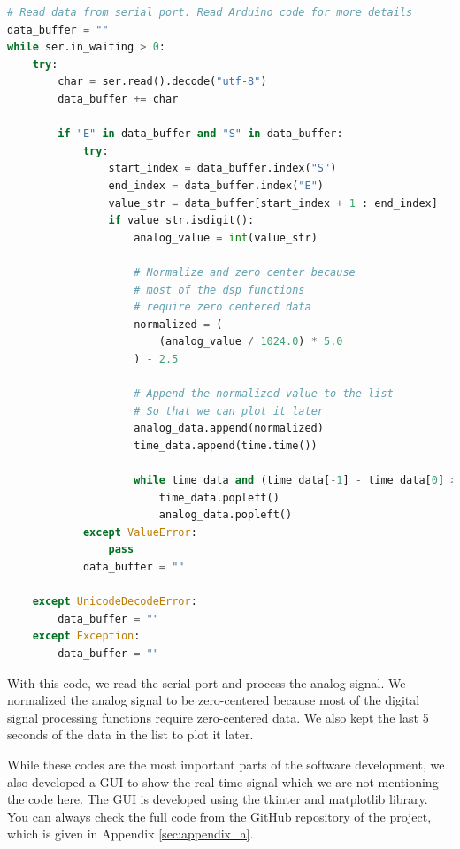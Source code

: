 \begin{lstlisting}[language=Python, caption=Python Code to Read Serial Port, label=lst:python_code_read_serial]
# Read data from serial port. Read Arduino code for more details
data_buffer = ""
while ser.in_waiting > 0:
    try:
        char = ser.read().decode("utf-8")
        data_buffer += char

        if "E" in data_buffer and "S" in data_buffer:
            try:
                start_index = data_buffer.index("S")
                end_index = data_buffer.index("E")
                value_str = data_buffer[start_index + 1 : end_index]
                if value_str.isdigit():
                    analog_value = int(value_str)

                    # Normalize and zero center because 
                    # most of the dsp functions 
                    # require zero centered data
                    normalized = (
                        (analog_value / 1024.0) * 5.0
                    ) - 2.5

                    # Append the normalized value to the list
                    # So that we can plot it later
                    analog_data.append(normalized)
                    time_data.append(time.time())

                    while time_data and (time_data[-1] - time_data[0] > 5):
                        time_data.popleft()
                        analog_data.popleft()
            except ValueError:
                pass
            data_buffer = ""

    except UnicodeDecodeError:
        data_buffer = ""
    except Exception:
        data_buffer = ""
\end{lstlisting}

\newpage
\thispagestyle{plain}

With this code, we read the serial port and process the analog signal. We normalized the analog signal to be zero-centered because most of the digital signal processing functions require zero-centered data. We also kept the last 5 seconds of the data in the list to plot it later.

While these codes are the most important parts of the software development, we also developed a GUI to show the real-time signal which we are not mentioning the code here. The GUI is developed using the tkinter and matplotlib library. You can always check the full code from the GitHub repository of the project, which is given in Appendix \ref{sec:appendix_a}.


